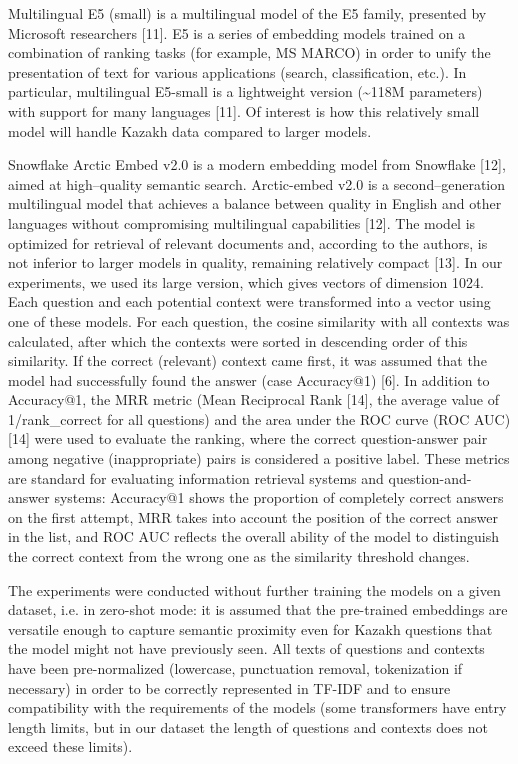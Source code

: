 \begin{multicols}{2}
Multilingual E5 (small) is a multilingual model of the E5 family,
presented by Microsoft researchers {[}11{]}. E5 is a series of embedding
models trained on a combination of ranking tasks (for example, MS MARCO)
in order to unify the presentation of text for various applications
(search, classification, etc.). In particular, multilingual E5-small is
a lightweight version (\textasciitilde118M parameters) with support for
many languages {[}11{]}. Of interest is how this relatively small model
will handle Kazakh data compared to larger models.

Snowflake Arctic Embed v2.0 is a modern embedding model from Snowflake
{[}12{]}, aimed at high--quality semantic search. Arctic-embed v2.0 is a
second--generation multilingual model that achieves a balance between
quality in English and other languages without compromising multilingual
capabilities {[}12{]}. The model is optimized for retrieval of relevant
documents and, according to the authors, is not inferior to larger
models in quality, remaining relatively compact {[}13{]}. In our
experiments, we used its large version, which gives vectors of dimension
1024. Each question and each potential context were transformed into a vector
using one of these models. For each question, the cosine similarity with
all contexts was calculated, after which the contexts were sorted in
descending order of this similarity. If the correct (relevant) context
came first, it was assumed that the model had successfully found the
answer (case Accuracy@1) {[}6{]}. In addition to Accuracy@1, the MRR
metric (Mean Reciprocal Rank {[}14{]}, the average value of
1/rank\_correct for all questions) and the area under the ROC curve (ROC
AUC) {[}14{]} were used to evaluate the ranking, where the correct
question-answer pair among negative (inappropriate) pairs is considered
a positive label. These metrics are standard for evaluating information
retrieval systems and question-and-answer systems: Accuracy@1 shows the
proportion of completely correct answers on the first attempt, MRR takes
into account the position of the correct answer in the list, and ROC AUC
reflects the overall ability of the model to distinguish the correct
context from the wrong one as the similarity threshold changes.

The experiments were conducted without further training the models on a
given dataset, i.e. in zero-shot mode: it is assumed that the
pre-trained embeddings are versatile enough to capture semantic
proximity even for Kazakh questions that the model might not have
previously seen. All texts of questions and contexts have been
pre-normalized (lowercase, punctuation removal, tokenization if
necessary) in order to be correctly represented in TF-IDF and to ensure
compatibility with the requirements of the models (some transformers
have entry length limits, but in our dataset the length of questions and
contexts does not exceed these limits).


\end{multicols}
